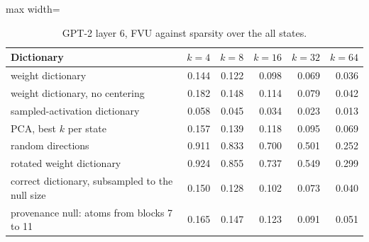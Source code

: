 \begin{table}[H]\centering\scriptsize
\caption{GPT-2 layer 6, FVU against sparsity over the all states.}\label{app:z-gpt2-all}
\begin{adjustbox}{max width=\linewidth}
\begin{tabular}{lrrrrr}\toprule
Dictionary & $k=4$ & $k=8$ & $k=16$ & $k=32$ & $k=64$ \\ \midrule
weight dictionary & 0.144 & 0.122 & 0.098 & 0.069 & 0.036 \\
weight dictionary, no centering & 0.182 & 0.148 & 0.114 & 0.079 & 0.042 \\
sampled-activation dictionary & 0.058 & 0.045 & 0.034 & 0.023 & 0.013 \\
PCA, best $k$ per state & 0.157 & 0.139 & 0.118 & 0.095 & 0.069 \\
random directions & 0.911 & 0.833 & 0.700 & 0.501 & 0.252 \\
rotated weight dictionary & 0.924 & 0.855 & 0.737 & 0.549 & 0.299 \\
correct dictionary, subsampled to the null size & 0.150 & 0.128 & 0.102 & 0.073 & 0.040 \\
provenance null: atoms from blocks 7 to 11 & 0.165 & 0.147 & 0.123 & 0.091 & 0.051 \\
\bottomrule\end{tabular}\end{adjustbox}
\end{table}
